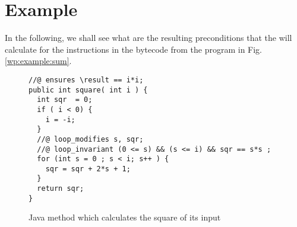 \section{Example}\label{wp:example}
In the following, we  shall see what are the resulting preconditions 
that the \fwpi{} will calculate for the instructions in the bytecode from the program in Fig. \ref{wp:example:sum}.








\begin{figure}
\begin{lstlisting}[frame=trbl]
//@ ensures \result == i*i; 
public int square( int i ) { 
  int sqr  = 0;
  if ( i < 0) {
    i = -i;
  }
  //@ loop_modifies s, sqr;
  //@ loop_invariant (0 <= s) && (s <= i) && sqr == s*s ;
  for (int s = 0 ; s < i; s++ ) {
    sqr = sqr + 2*s + 1;
  }
  return sqr;
}

\end{lstlisting} 
\caption{\sc Java method which calculates the square of its input  }
\label{wp:example:sqrSrc}
\end{figure}


